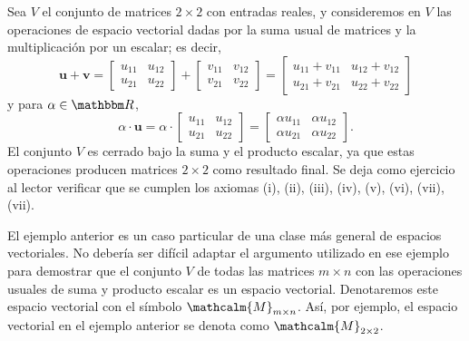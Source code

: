 \begin{examplebox}{}{}
    Sea $V$ el conjunto de matrices $2 \times 2$ con entradas reales, y consideremos en $V$ las operaciones de espacio vectorial dadas por la suma usual de matrices y la multiplicación por un escalar; es decir,
    \begin{equation}
        \mathbf{u} + \mathbf{v} = \begin{bmatrix}
            u_{11} & u_{12} \\
            u_{21} & u_{22}
        \end{bmatrix} + \begin{bmatrix}
            v_{11} & v_{12} \\
            v_{21} & v_{22}
        \end{bmatrix} = \begin{bmatrix}
            u_{11} + v_{11} & u_{12} + v_{12} \\
            u_{21} + v_{21} & u_{22} + v_{22}
        \end{bmatrix} \label{eq:suma_matriz22}
    \end{equation}
    y para $\alpha \in \RR$,
    $$\alpha \cdot \mathbf{u} = \alpha \cdot \begin{bmatrix}
        u_{11} & u_{12} \\
        u_{21} & u_{22}
    \end{bmatrix} = \begin{bmatrix}
        \alpha u_{11} & \alpha u_{12} \\
        \alpha u_{21} & \alpha u_{22}
    \end{bmatrix}.$$
    El conjunto $V$ es cerrado bajo la suma y el producto escalar, ya que estas operaciones producen matrices $2 \times 2$ como resultado final. Se deja como ejercicio al lector verificar que se cumplen los axiomas (i), (ii), (iii), (iv), (v), (vi), (vii), (vii).
\end{examplebox}

\newpage

\begin{examplebox}{}{}
    El ejemplo anterior es un caso particular de una clase más general de espacios vectoriales. No debería ser difícil adaptar el argumento utilizado en ese ejemplo para demostrar que el conjunto $V$ de todas las matrices $m \times n$ con las operaciones usuales de suma y producto escalar es un espacio vectorial. Denotaremos este espacio vectorial con el símbolo $\mathcalm{M}_{m \times n}$. Así, por ejemplo, el espacio vectorial en el ejemplo anterior se denota como $\mathcalm{M}_{2 \times 2}$.
\end{examplebox}

